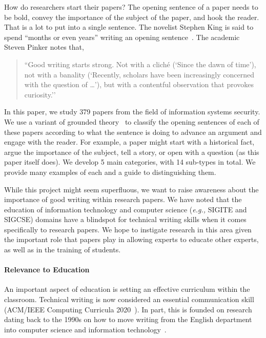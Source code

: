 \documentclass[sigconf,anonymous]{acmart}
\newcommand{\eg}{\textit{e.g.,}\xspace}
\begin{document}
How do researchers start their papers? The opening sentence of a paper needs to be bold, convey the importance of the subject of the paper, and hook the reader. That is a lot to put into a single sentence. The novelist Stephen King is said to spend ``months or even years'' writing an opening sentence~\cite{Fas13}. The academic Steven Pinker notes that,

\begin{quote}
``Good writing starts strong. Not with a cliché (`Since the dawn of time’), not with a banality (`Recently, scholars have been increasingly concerned with the question of …’), but with a contentful observation that provokes curiosity.''~\cite{Pin15}
\end{quote}

In this paper, we study 379 papers from the field of information systems security. We use a variant of grounded theory~\cite{glaser1968discovery} to classify the opening sentences of each of these papers according to what the sentence is doing to advance an argument and engage with the reader. For example, a paper might start with a historical fact, argue the importance of the subject, tell a story, or open with a question (as this paper itself does). We develop 5 main categories, with 14 sub-types in total. We provide many examples of each and a guide to distinguishing them.

While this project might seem superfluous, we want to raise awareness about the importance of good writing within research papers. We have noted that the education of information technology and computer science (\eg SIGITE and SIGCSE) domains have a blindspot for technical writing skills when it comes specifically to research papers. We hope to instigate research in this area given the important role that papers play in allowing experts to educate other experts, as well as in the training of students.
	
\paragraph{Relevance to Education}

An important aspect of education is setting an effective curriculum within the classroom. Technical writing is now considered an essential communication skill (ACM/IEEE Computing Curricula 2020~\cite{CC2020,CC2020report}). In part, this is founded on research dating back to the 1990s on how to move writing from the English department into computer science and information technology~\cite{Pes91,TP93,FPC96,Kay98}.
\end{document}
